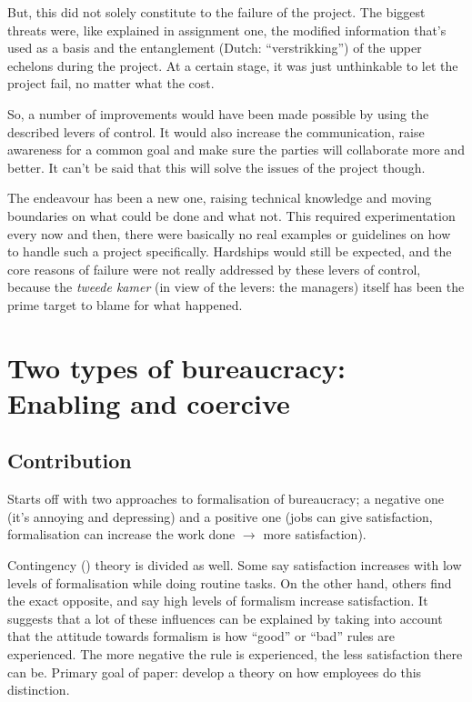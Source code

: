 \documentclass[]{uva-bachelor-thesis}
\begin{document}
But, this did not solely constitute to the failure of the project. 
The biggest threats were, like explained in assignment one, the modified information that's used as a basis and the entanglement (Dutch: ``verstrikking'') of the upper echelons during the project.
At a certain stage, it was just unthinkable to let the project fail, no matter what the cost.

So, a number of improvements would have been made possible by using the described levers of control. 
It would also increase the communication, raise awareness for a common goal and make sure the parties will collaborate more and better. 
It can't be said that this will solve the issues of the project though. 

The endeavour has been a new one, raising technical knowledge and moving boundaries on what could be done and what not. 
This required experimentation every now and then, there were basically no real examples or guidelines on how to handle such a project specifically. 
Hardships would still be expected, and the core reasons of failure were not really addressed by these levers of control, because the \emph{tweede kamer} (in view of the levers: the managers) itself has been the prime target to blame for what happened. 

\chapter{Two types of bureaucracy: Enabling and coercive \cite{adler1996two}}

\section{Contribution}
Starts off with two approaches to formalisation of bureaucracy; a negative one (it's annoying and depressing) and a positive one (jobs can give satisfaction, formalisation can increase the work done $\rightarrow$ more satisfaction).

Contingency () theory is divided as well. 
Some say satisfaction increases with low levels of formalisation while doing routine tasks. 
On the other hand, others find the exact opposite, and say high levels of formalism increase satisfaction. 
It suggests that a lot of these influences can be explained by taking into account that the attitude towards formalism is how ``good'' or ``bad'' rules are experienced. 
The more negative the rule is experienced, the less satisfaction there can be.
Primary goal of paper: develop a theory on how employees do this distinction.
\end{document}
